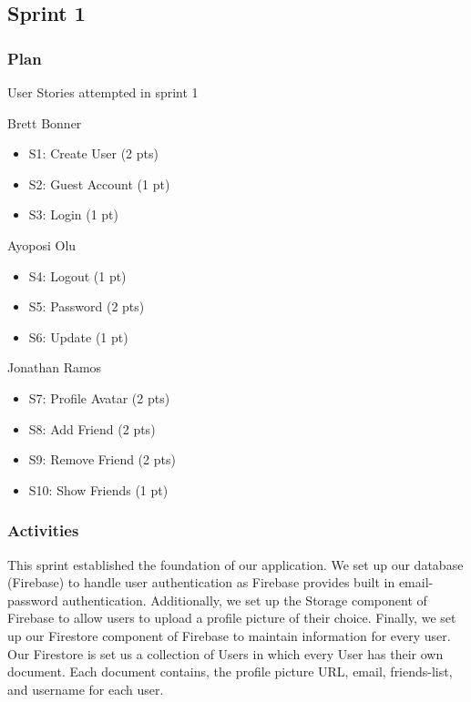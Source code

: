 \subsection{Sprint 1}

\subsubsection{Plan}
User Stories attempted in sprint 1 

Brett Bonner
\begin{itemize}
    \item S1: Create User (2 pts)
    \item S2: Guest Account (1 pt)
    \item S3: Login (1 pt)
\end{itemize}


Ayoposi Olu

\begin{itemize}
    \item S4: Logout (1 pt)
    \item S5: Password (2 pts)
    \item S6: Update (1 pt)
\end{itemize}


Jonathan Ramos

\begin{itemize}
    \item S7: Profile Avatar (2 pts)
    \item S8: Add Friend (2 pts)
    \item S9: Remove Friend (2 pts)
    \item S10: Show Friends (1 pt)
\end{itemize}

\subsubsection{Activities}

This sprint established the foundation of our application. We set up our database (Firebase) to handle user authentication as Firebase provides built in email-password authentication. Additionally, we set up the Storage component of Firebase to allow users to upload a profile picture of their choice. Finally, we set up our Firestore component of Firebase to maintain information for every user. Our Firestore is set us a collection of Users in which every User has their own document. Each document contains, the profile picture URL, email, friends-list, and username for each user. 

